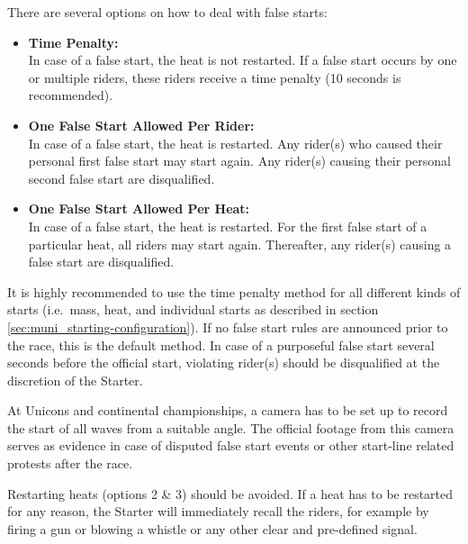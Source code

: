 There are several options on how to deal with false starts:
\begin{itemize}
\item \textbf{Time Penalty:}\\
In case of a false start, the heat is not restarted.
If a false start occurs by one or multiple riders, these riders receive a time penalty (10 seconds is recommended).
\item \textbf{One False Start Allowed Per Rider:}\\
In case of a false start, the heat is restarted.
Any rider(s) who caused their personal first false start may start again.
Any rider(s) causing their personal second false start are disqualified.
\item \textbf{One False Start Allowed Per Heat:}\\
In case of a false start, the heat is restarted.
For the first false start of a particular heat, all riders may start again.
Thereafter, any rider(s) causing a false start are disqualified.
\end{itemize}

It is highly recommended to use the time penalty method for all different kinds of starts (i.e.\ mass, heat, and individual starts as described in section \ref{sec:muni_starting-configuration}).
If no false start rules are announced prior to the race, this is the default method.
In case of a purposeful false start several seconds before the official start, violating rider(s) should be disqualified at the discretion of the Starter.

At Unicons and continental championships, a camera has to be set up to record the start of all waves from a suitable angle.
The official footage from this camera serves as evidence in case of disputed false start events or other start-line related protests after the race.

Restarting heats (options 2 \& 3) should be avoided.
If a heat has to be restarted for any reason, the Starter will immediately recall the riders, for example by firing a gun or blowing a whistle or any other clear and pre-defined signal.
